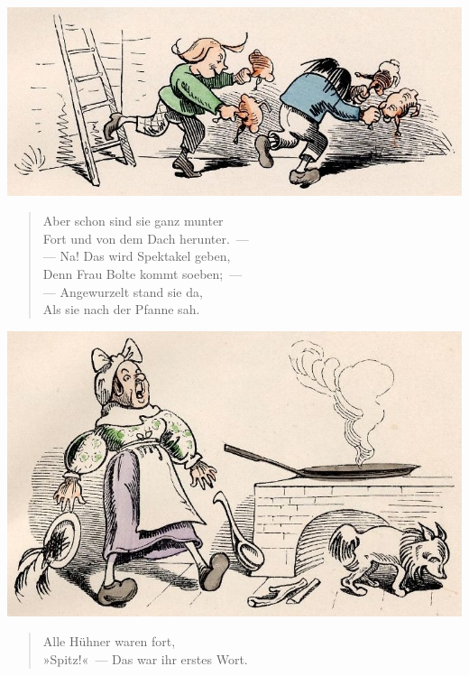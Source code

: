 \documentclass[a4paper,12pt]{article}
\begin{document}
\begin{center}\includegraphics[scale=.7, alt={Flucht mit der Beute}]{images/2-06.jpg}\end{center}



\begin{verse}
Aber schon sind sie ganz munter\\{}
Fort und von dem Dach herunter.~—\\{}
— Na! Das wird Spektakel geben,\\{}
Denn Frau Bolte kommt soeben;~—\\{}
— Angewurzelt stand sie da,\\{}
Als sie nach der Pfanne sah.
\end{verse}



\begin{center}\includegraphics[scale=.7, alt={Alle Hühner waren fort}]{images/2-07.jpg}\end{center}



\begin{verse}
Alle Hühner waren fort,\\{}
»Spitz!«~— Das war ihr erstes Wort.
\end{verse}
\end{document}
